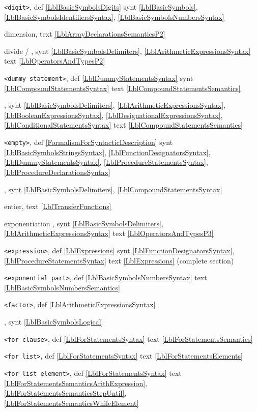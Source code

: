 \documentclass[a4paper,11pt]{article}
\begin{document}
\texttt{<digit>},
def
\ref{LblBasicSymbolsDigits}
synt
\ref{LblBasicSymbols},
\ref{LblBasicSymbolsIdentifiersSyntax},
\ref{LblBasicSymbolsNumbersSyntax}\*

dimension,
text
\ref{LblArrayDeclarationsSemanticsP2}\*

divide / \mdiv{},
synt
\ref{LblBasicSymbolsDelimiters},
\ref{LblArithmeticExpressionsSyntax}
text
\ref{LblOperatorsAndTypesP2}\*

\texttt{<dummy statement>},
def
\ref{LblDummyStatementsSyntax}
synt
\ref{LblCompoundStatementsSyntax}
text
\ref{LblCompoundStatementsSemantics}\*

,
synt
\ref{LblBasicSymbolsDelimiters},
\ref{LblArithmeticExpressionsSyntax},
\ref{LblBooleanExpressionsSyntax},
\ref{LblDesignationalExpressionsSyntax},
\ref{LblConditionalStatementsSyntax}
text
\ref{LblCompoundStatementsSemantics}\*

\texttt{<empty>},
def
\ref{FormalismForSyntacticDescription}
synt
\ref{LblBasicSymbolsStringsSyntax},
\ref{LblFunctionDesignatorsSyntax},
\ref{LblDummyStatementsSyntax},
\ref{LblProcedureStatementsSyntax},
\ref{LblProcedureDeclarationsSyntax}\*

,
synt
\ref{LblBasicSymbolsDelimiters},
\ref{LblCompoundStatementsSyntax}\*

entier,
text
\ref{LblTransferFunctions}\*

exponentiation \mpow{},
synt
\ref{LblBasicSymbolsDelimiters},
\ref{LblArithmeticExpressionsSyntax}
text
\ref{LblOperatorsAndTypesP3}\*

\texttt{<expression>},
def
\ref{LblExpressions}
synt
\ref{LblFunctionDesignatorsSyntax},
\ref{LblProcedureStatementsSyntax}
text
\ref{LblExpressions} (complete section)\*

\texttt{<exponential part>},
def
\ref{LblBasicSymbolsNumbersSyntax}
text
\ref{LblBasicSymbolsNumbersSemantics}\*

\texttt{<factor>},
def
\ref{LblArithmeticExpressionsSyntax}\*

,
synt
\ref{LblBasicSymbolsLogical}\*

\texttt{<for clause>},
def
\ref{LblForStatementsSyntax}
text
\ref{LblForStatementsSemantics}\*

\texttt{<for list>},
def
\ref{LblForStatementsSyntax}
text
\ref{LblForStatementsElements}\*

\texttt{<for list element>},
def
\ref{LblForStatementsSyntax}
text
\ref{LblForStatementsSemanticsArithExpression},
\ref{LblForStatementsSemanticsStepUntil},
\ref{LblForStatementsSemanticsWhileElement}\*
\end{document}
